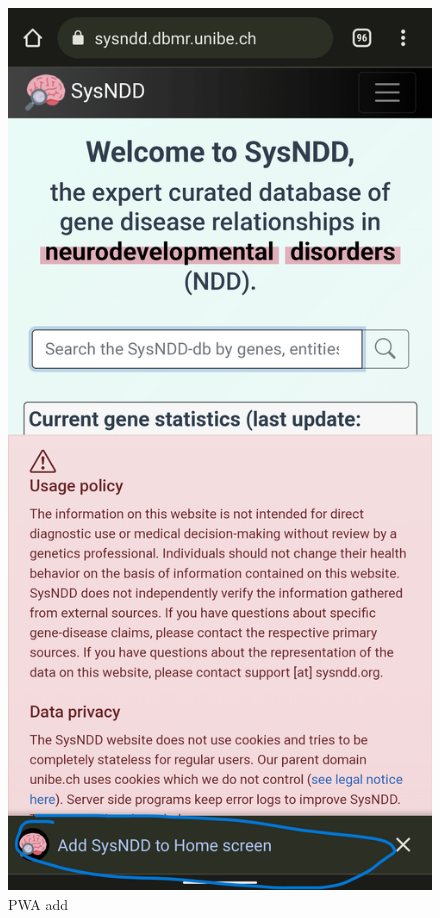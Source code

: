 \documentclass[
]{article}
\begin{document}
\begin{figure}
\centering
\includegraphics{./static/img/02_24-PWA-install-a.png}
\caption{PWA add}
\end{figure}
\end{document}
